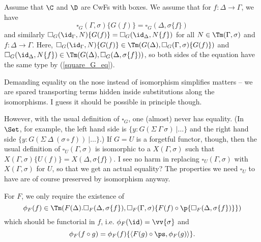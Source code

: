 \documentclass{article}
\newcommand{\isoGR}{\ensuremath{\phi_{G\rightarrow}}}
\newcommand{\isoGL}{\ensuremath{\phi_{G\leftarrow}}}
\newcommand{\isoFL}{\ensuremath{\phi_{F}}} %
\begin{document}
Assume that $\C$ and $\D$ are CwFs with boxes. We assume that for $f :
\Delta \to \Gamma$, we have
 \begin{equation} \label{square_G_eq}
 \square_G(\Gamma, \sigma)\{G(f)\} = \square_G(\Delta, \sigma\{f\})
 \end{equation}
 and similarly $\square_G(\id_{\Gamma}, N)\{G(f)\} =
 \square_G(\id_{\Delta}, N\{f\})$ for all $N \in \Tm(\Gamma, \sigma)$
 and $f : \Delta \to \Gamma$. Here, $\square_G(\id_{\Gamma},
 N)\{G(f)\} \in \Tm(G(\Delta), \square_G(\Gamma, \sigma)\{G(f)\})$ and
 $\square_G(\id_{\Delta}, N\{f\}) \in \Tm(G(\Delta), \square_G(\Delta,
 \sigma\{f\}))$, so both sides of the equation have the same type by
 (\ref{square_G_eq}).

\begin{remark}
  Demanding equality on the nose instead of isomorphism simplifies
  matters -- we are spared transporting terms hidden inside
  substitutions along the isomorphisms. I guess it should be possible
  in principle though.

  However, with the usual definition of $\square_G$, one (almost)
  never has equality. (In $\Set$, for example, the left hand side is
  $\{ y : G(\Sigma\ \Gamma\ \sigma)\ |\ldots\}$ and the right hand
  side $\{ y : G(\Sigma\ \Delta\ (\sigma \circ f))\ |\ldots\}$.)  If
  $G = U$ is a forgetful functor, though, then the usual definition of
  $\square_U(\Gamma, \sigma)$ is isomorphic to a $X(\Gamma, \sigma)$
  such that $X(\Gamma, \sigma)\{U(f)\} = X(\Delta, \sigma\{f\})$. I
  see no harm in replacing $\square_U(\Gamma, \sigma)$ with $X(\Gamma,
  \sigma)$ for $U$, so that we get an actual equality? The properties
  we need $\square_U$ to have are of course preserved by isomorphism
  anyway.
\end{remark}
%
For $F$, we only require the existence of
\[
\isoFL(f) \in \Tm(F(\Delta).\square_F(\Delta, \sigma\{f\}),
\square_F(\Gamma, \sigma)\{F(f) \circ \p{\square_F(\Delta,
  \sigma\{f\})}\})
\]
which should be functorial in $f$, i.e. $\isoFL(\id) = \vv{\sigma}$
and 
\[
\isoFL(f \circ g) = \isoFL(f)\{\langle F(g) \circ \ps, \isoFL(g)\rangle\}.
\]
\end{document}
